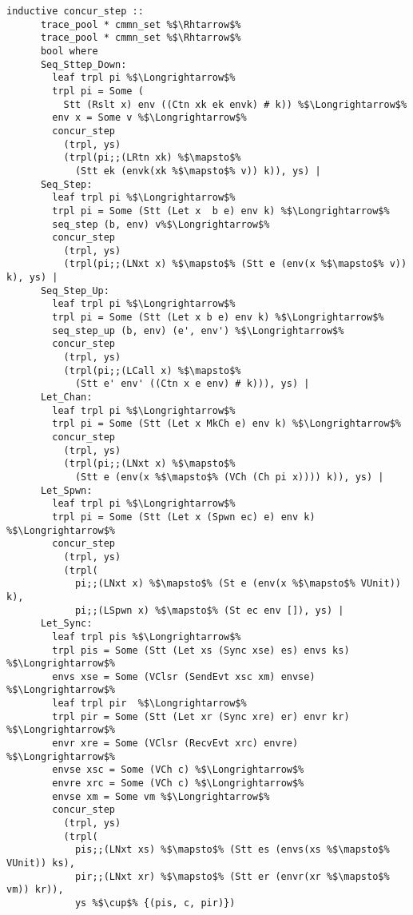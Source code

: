 \documentclass{article}
\begin{document}
\begin{lstlisting}[style=codestyle1, escapechar=\%]
    inductive concur_step ::
      trace_pool * cmmn_set %$\Rhtarrow$%
      trace_pool * cmmn_set %$\Rhtarrow$%
      bool where 
      Seq_Sttep_Down:
        leaf trpl pi %$\Longrightarrow$%
        trpl pi = Some (
          Stt (Rslt x) env ((Ctn xk ek envk) # k)) %$\Longrightarrow$%
        env x = Some v %$\Longrightarrow$%
        concur_step
          (trpl, ys)
          (trpl(pi;;(LRtn xk) %$\mapsto$%
            (Stt ek (envk(xk %$\mapsto$% v)) k)), ys) |
      Seq_Step:
        leaf trpl pi %$\Longrightarrow$%
        trpl pi = Some (Stt (Let x  b e) env k) %$\Longrightarrow$%
        seq_step (b, env) v%$\Longrightarrow$%
        concur_step
          (trpl, ys)
          (trpl(pi;;(LNxt x) %$\mapsto$% (Stt e (env(x %$\mapsto$% v)) k), ys) |
      Seq_Step_Up: 
        leaf trpl pi %$\Longrightarrow$%
        trpl pi = Some (Stt (Let x b e) env k) %$\Longrightarrow$%
        seq_step_up (b, env) (e', env') %$\Longrightarrow$%
        concur_step
          (trpl, ys)
          (trpl(pi;;(LCall x) %$\mapsto$%
            (Stt e' env' ((Ctn x e env) # k))), ys) |
      Let_Chan: 
        leaf trpl pi %$\Longrightarrow$%
        trpl pi = Some (Stt (Let x MkCh e) env k) %$\Longrightarrow$%
        concur_step
          (trpl, ys)
          (trpl(pi;;(LNxt x) %$\mapsto$%
            (Stt e (env(x %$\mapsto$% (VCh (Ch pi x)))) k)), ys) |
      Let_Spwn:
        leaf trpl pi %$\Longrightarrow$%
        trpl pi = Some (Stt (Let x (Spwn ec) e) env k) %$\Longrightarrow$%
        concur_step
          (trpl, ys)
          (trpl(
            pi;;(LNxt x) %$\mapsto$% (St e (env(x %$\mapsto$% VUnit)) k), 
            pi;;(LSpwn x) %$\mapsto$% (St ec env []), ys) |
      Let_Sync:
        leaf trpl pis %$\Longrightarrow$%
        trpl pis = Some (Stt (Let xs (Sync xse) es) envs ks) %$\Longrightarrow$%
        envs xse = Some (VClsr (SendEvt xsc xm) envse) %$\Longrightarrow$%
        leaf trpl pir  %$\Longrightarrow$%
        trpl pir = Some (Stt (Let xr (Sync xre) er) envr kr) %$\Longrightarrow$%
        envr xre = Some (VClsr (RecvEvt xrc) envre) %$\Longrightarrow$%
        envse xsc = Some (VCh c) %$\Longrightarrow$%
        envre xrc = Some (VCh c) %$\Longrightarrow$%
        envse xm = Some vm %$\Longrightarrow$%
        concur_step
          (trpl, ys)
          (trpl(
            pis;;(LNxt xs) %$\mapsto$% (Stt es (envs(xs %$\mapsto$% VUnit)) ks), 
            pir;;(LNxt xr) %$\mapsto$% (Stt er (envr(xr %$\mapsto$% vm)) kr)), 
            ys %$\cup$% {(pis, c, pir)})


    \end{lstlisting}
\end{document}
